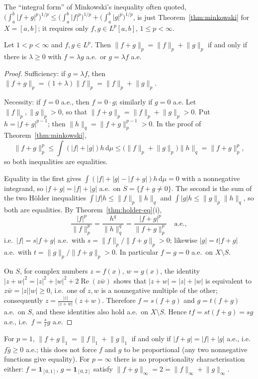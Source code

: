 \documentclass[11pt]{article}
\newcommand{\norm}[1]{\lVert #1\rVert}
\newcommand{\dmu}{\,\mathrm{d}\mu}
\newcommand{\ind}{\mathbf{1}}
\begin{document}
The ``integral form'' of Minkowski's inequality often quoted, $\bigl(\int_{a}^{b}|f+g|^{p}\bigr)^{1/p}\le\bigl(\int_{a}^{b}|f|^{p}\bigr)^{1/p}+\bigl(\int_{a}^{b}|g|^{p}\bigr)^{1/p}$, is just Theorem~\ref{thm:minkowski} for $X=[a,b]$; it requires only $f,g\in L^{p}[a,b]$, $1\le p<\infty$.

\begin{theorem}\label{thm:mink-eq}
Let $1<p<\infty$ and $f,g\in L^{p}$. Then $\norm{f+g}_{p}=\norm{f}_{p}+\norm{g}_{p}$ if and only if there is $\lambda\ge0$ with $f=\lambda g$ a.e.\ or $g=\lambda f$ a.e.
\end{theorem}

\begin{proof}
Sufficiency: if $g=\lambda f$, then $\norm{f+g}_{p}=(1+\lambda)\norm{f}_{p}=\norm{f}_{p}+\norm{g}_{p}$.

Necessity: if $f=0$ a.e., then $f=0\cdot g$; similarly if $g=0$ a.e. Let $\norm{f}_{p},\norm{g}_{p}>0$, so that $\norm{f+g}_{p}=\norm{f}_{p}+\norm{g}_{p}>0$. Put $h=|f+g|^{p-1}$; then $\norm{h}_{q}=\norm{f+g}_{p}^{p-1}>0$. In the proof of Theorem~\ref{thm:minkowski},
\[
\norm{f+g}_{p}^{p}\le\int(|f|+|g|)h\dmu\le\bigl(\norm{f}_{p}+\norm{g}_{p}\bigr)\norm{h}_{q}=\norm{f+g}_{p}^{p},
\]
so both inequalities are equalities.

Equality in the first gives $\int(|f|+|g|-|f+g|)h\dmu=0$ with a nonnegative integrand, so $|f+g|=|f|+|g|$ a.e.\ on $S=\{f+g\ne0\}$. The second is the sum of the two Hölder inequalities $\int|f|h\le\norm{f}_{p}\norm{h}_{q}$ and $\int|g|h\le\norm{g}_{p}\norm{h}_{q}$, so both are equalities. By Theorem~\ref{thm:holder-eq}(i),
\[
\frac{|f|^{p}}{\norm{f}_{p}^{p}}=\frac{h^{q}}{\norm{h}_{q}^{q}}=\frac{|f+g|^{p}}{\norm{f+g}_{p}^{p}}\quad\text{a.e.},
\]
i.e.\ $|f|=s|f+g|$ a.e.\ with $s=\norm{f}_{p}/\norm{f+g}_{p}>0$; likewise $|g|=t|f+g|$ a.e.\ with $t=\norm{g}_{p}/\norm{f+g}_{p}>0$. In particular $f=g=0$ a.e.\ on $X\setminus S$.

On $S$, for complex numbers $z=f(x)$, $w=g(x)$, the identity $|z+w|^{2}=|z|^{2}+|w|^{2}+2\operatorname{Re}(z\bar w)$ shows that $|z+w|=|z|+|w|$ is equivalent to $z\bar w=|z||w|\ge0$, i.e.\ one of $z,w$ is a nonnegative multiple of the other; consequently $z=\frac{|z|}{|z+w|}(z+w)$. Therefore $f=s(f+g)$ and $g=t(f+g)$ a.e.\ on $S$, and these identities also hold a.e.\ on $X\setminus S$. Hence $tf=st(f+g)=sg$ a.e., i.e.\ $f=\frac{s}{t}g$ a.e.
\end{proof}

\begin{remark}
For $p=1$, $\norm{f+g}_{1}=\norm{f}_{1}+\norm{g}_{1}$ if and only if $|f+g|=|f|+|g|$ a.e., i.e.\ $f\bar g\ge0$ a.e.; this does not force $f$ and $g$ to be proportional (any two nonnegative functions give equality). For $p=\infty$ there is no proportionality characterisation either: $f=\ind_{[0,1]}$, $g=\ind_{[0,2]}$ satisfy $\norm{f+g}_{\infty}=2=\norm{f}_{\infty}+\norm{g}_{\infty}$.
\end{remark}
\end{document}
